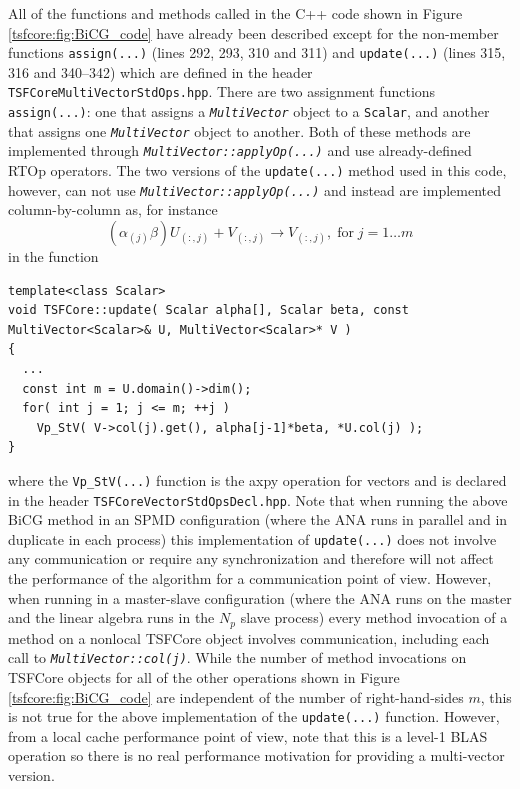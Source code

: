 %
All of the functions and methods called in the C++ code shown in
Figure \ref{tsfcore:fig:BiCG_code} have already been described except
for the non-member functions \texttt{assign(...)} (lines 292, 293, 310
and 311) and \texttt{update(...)} (lines 315, 316 and 340--342) which
are defined in the header \texttt{TSFCore\-Multi\-Vector\-Std\-Ops.hpp}.
There are two assignment functions \texttt{assign(...)}: one that
assigns a \texttt{\textit{Multi\-Vector}} object to a \texttt{Scalar},
and another that assigns one \texttt{\textit{Multi\-Vector}} object to
another.  Both of these methods are implemented through
\texttt{\textit{Multi\-Vector\-::applyOp(\-...)}} and use already-defined
RTOp operators.  The two versions of the \texttt{update(...)} method
used in this code, however, can not use
\texttt{\textit{Multi\-Vector\-::applyOp(\-...)}} and instead are
implemented column-by-column as, for instance
%
\[
(\alpha_{(j)} \beta) U_{(:,j)} + V_{(:,j)} \rightarrow V_{(:,j)}, \; \mbox{for} \; j = 1 \ldots m
\]
%
in the function

{\scriptsize\begin{verbatim}
template<class Scalar>
void TSFCore::update( Scalar alpha[], Scalar beta, const MultiVector<Scalar>& U, MultiVector<Scalar>* V )
{
  ...
  const int m = U.domain()->dim();
  for( int j = 1; j <= m; ++j )
    Vp_StV( V->col(j).get(), alpha[j-1]*beta, *U.col(j) );
}
\end{verbatim}}

{}\noindent{}where the \texttt{Vp\_StV(...)} function is the axpy operation for
vectors and is declared in the header
\texttt{TSFCore\-Vector\-StdOps\-Decl.hpp}.  Note that when running the
above BiCG method in an SPMD configuration (where the ANA runs in
parallel and in duplicate in each process) this implementation of
\texttt{update(...)} does
not involve any communication or require any synchronization and
therefore will not affect the performance of the algorithm for a
communication point of view.  However, when running in a master-slave
configuration (where the ANA runs on the master and the linear algebra
runs in the $N_p$ slave process) every method invocation of a method
on a nonlocal TSFCore object involves communication, including each
call to
\texttt{\textit{Multi\-Vector\-::col(j)}}.  While the number of method
invocations on TSFCore objects for all of the other operations shown in
Figure \ref{tsfcore:fig:BiCG_code} are independent of the number of
right-hand-sides $m$, this is not true for the above implementation of
the \texttt{update(...)} function.  However, from a local cache
performance point of view, note that this is a level-1 BLAS operation
so there is no real performance motivation for providing a
multi-vector version.

